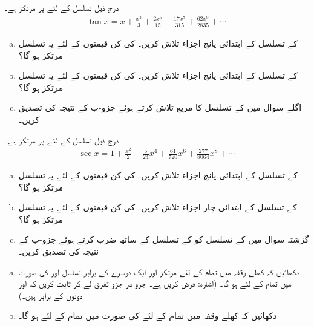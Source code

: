 درج ذیل تسلسل  کے لئے  پر مرتکز ہے۔
\begin{align*}
\tan x=x+\frac{x^3}{3}+\frac{2x^5}{15}+\frac{17x^7}{315}+\frac{62x^9}{2835}+\cdots
\end{align*}
\begin{enumerate}[a.]
\item
{} کے تسلسل کے ابتدائی پانچ اجزاء تلاش کریں۔  کی کن  قیمتوں کے لئے یہ تسلسل مرتکز ہو گا؟
\item
{} کے تسلسل کے ابتدائی پانچ اجزاء تلاش کریں۔  کی کن  قیمتوں کے لئے یہ تسلسل مرتکز ہو گا؟
\item
اگلے سوال میں  کے تسلسل کا مربع تلاش کرتے ہوئے جزو-ب کے نتیجہ کی تصدیق کریں۔
\end{enumerate}
درج ذیل تسلسل  کے لئے  پر مرتکز ہے۔
\begin{align*}
\sec x=1+\frac{x^2}{2}+\frac{5}{24}x^4+\frac{61}{720}x^6+\frac{277}{8064}x^8+\cdots
\end{align*}
\begin{enumerate}[a.]
\item
{} کے تسلسل کے ابتدائی پانچ اجزاء تلاش کریں۔  کی کن  قیمتوں کے لئے یہ تسلسل مرتکز ہو گا؟
\item
{} کے تسلسل کے ابتدائی چار اجزاء تلاش کریں۔  کی کن  قیمتوں کے لئے یہ تسلسل مرتکز ہو گا؟
\item
گزشتہ سوال میں  کے تسلسل کو  کے تسلسل کے ساتھ ضرب کرتے ہوئے جزو-ب کے نتیجہ کی تصدیق کریں۔
\end{enumerate}
\begin{enumerate}[a.]
\item
دکھائیں کہ کھلے وقفہ  میں تمام  کے لئے مرتکز اور ایک دوسرے کے برابر تسلسل  اور  کی صورت میں تمام  کے لئے  ہو گا۔ (اشارہ: فرض کریں  ہے۔ جزو در جزو تفرق لے کر ثابت کریں کہ  اور  دونوں  کے برابر ہیں۔)
\item
دکھائیں کہ کھلے وقفہ  میں تمام  کے لئے  کی صورت میں تمام  کے لئے  ہو گا۔
\end{enumerate}
